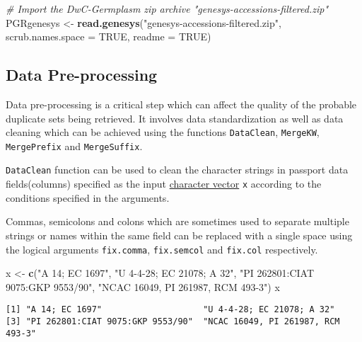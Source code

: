 \documentclass[]{article}
\newenvironment{Shaded}{\begin{snugshade}}{\end{snugshade}}
\newcommand{\CommentTok}[1]{\textcolor[rgb]{0.56,0.35,0.01}{\textit{#1}}}
\newcommand{\DataTypeTok}[1]{\textcolor[rgb]{0.13,0.29,0.53}{#1}}
\newcommand{\KeywordTok}[1]{\textcolor[rgb]{0.13,0.29,0.53}{\textbf{#1}}}
\newcommand{\NormalTok}[1]{#1}
\newcommand{\OtherTok}[1]{\textcolor[rgb]{0.56,0.35,0.01}{#1}}
\newcommand{\StringTok}[1]{\textcolor[rgb]{0.31,0.60,0.02}{#1}}
\begin{document}
\begin{Shaded}
\begin{Highlighting}[]
\CommentTok{# Import the DwC-Germplasm zip archive "genesys-accessions-filtered.zip"}
\NormalTok{PGRgenesys <-}\StringTok{ }\KeywordTok{read.genesys}\NormalTok{(}\StringTok{"genesys-accessions-filtered.zip"}\NormalTok{,}
                           \DataTypeTok{scrub.names.space =} \OtherTok{TRUE}\NormalTok{, }\DataTypeTok{readme =} \OtherTok{TRUE}\NormalTok{)}
\end{Highlighting}
\end{Shaded}

\hypertarget{data-pre-processing}{%
\subsection{Data Pre-processing}\label{data-pre-processing}}

Data pre-processing is a critical step which can affect the quality of
the probable duplicate sets being retrieved. It involves data
standardization as well as data cleaning which can be achieved using the
functions \texttt{DataClean}, \texttt{MergeKW}, \texttt{MergePrefix} and
\texttt{MergeSuffix}.

\texttt{DataClean} function can be used to clean the character strings
in passport data fields(columns) specified as the input
\href{http://google.com/\#q=\%5BR\%5D+character+vector}{character
vector} \texttt{x} according to the conditions specified in the
arguments.

Commas, semicolons and colons which are sometimes used to separate
multiple strings or names within the same field can be replaced with a
single space using the logical arguments \texttt{fix.comma},
\texttt{fix.semcol} and \texttt{fix.col} respectively.

\begin{Shaded}
\begin{Highlighting}[]
\NormalTok{x <-}\StringTok{ }\KeywordTok{c}\NormalTok{(}\StringTok{"A 14; EC 1697"}\NormalTok{, }\StringTok{"U 4-4-28; EC 21078; A 32"}\NormalTok{, }\StringTok{"PI 262801:CIAT 9075:GKP 9553/90"}\NormalTok{,}
       \StringTok{"NCAC 16049, PI 261987, RCM 493-3"}\NormalTok{)}
\NormalTok{x}
\end{Highlighting}
\end{Shaded}

\begin{verbatim}
[1] "A 14; EC 1697"                    "U 4-4-28; EC 21078; A 32"        
[3] "PI 262801:CIAT 9075:GKP 9553/90"  "NCAC 16049, PI 261987, RCM 493-3"
\end{verbatim}
\end{document}
